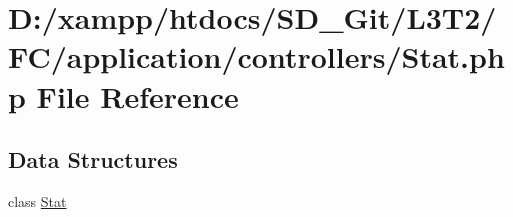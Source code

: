 \hypertarget{controllers_2_stat_8php}{}\section{D\+:/xampp/htdocs/\+S\+D\+\_\+\+Git/\+L3\+T2/\+F\+C/application/controllers/\+Stat.php File Reference}
\label{controllers_2_stat_8php}
\subsection*{Data Structures}
\begin{DoxyCompactItemize}
\item 
class \hyperlink{class_stat}{Stat}
\end{DoxyCompactItemize}
